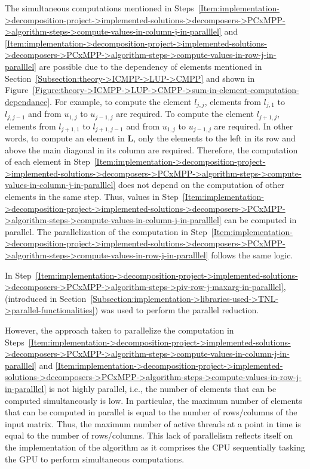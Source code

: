 The simultaneous computations mentioned in Steps~\ref{Item:implementation->decomposition-project->implemented-solutions->decomposers->PCxMPP->algorithm-steps->compute-values-in-column-j-in-paralllel} and \ref{Item:implementation->decomposition-project->implemented-solutions->decomposers->PCxMPP->algorithm-steps->compute-values-in-row-j-in-paralllel} are possible due to the dependency of elements mentioned in Section~\ref{Subsection:theory->ICMPP->LUP->CMPP} and shown in Figure~\ref{Figure:theory->ICMPP->LUP->CMPP->sum-in-element-computation-dependance}. For example, to compute the element $l_{j,j}$, elements from $l_{j,1}$ to $l_{j,j-1}$ and from $u_{1,j}$ to $u_{j-1,j}$ are required. To compute the element $l_{j+1,j}$, elements from $l_{j+1,1}$ to $l_{j+1,j-1}$ and from $u_{1,j}$ to $u_{j-1,j}$ are required. In other words, to compute an element in $\mathbf{L}$, only the elements to the left in its row and above the main diagonal in its column are required. Therefore, the computation of each element in Step~\ref{Item:implementation->decomposition-project->implemented-solutions->decomposers->PCxMPP->algorithm-steps->compute-values-in-column-j-in-paralllel} does not depend on the computation of other elements in the same step. Thus, values in Step~\ref{Item:implementation->decomposition-project->implemented-solutions->decomposers->PCxMPP->algorithm-steps->compute-values-in-column-j-in-paralllel} can be computed in parallel. The parallelization of the computation in Step~\ref{Item:implementation->decomposition-project->implemented-solutions->decomposers->PCxMPP->algorithm-steps->compute-values-in-row-j-in-paralllel} follows the same logic.

In Step~\ref{Item:implementation->decomposition-project->implemented-solutions->decomposers->PCxMPP->algorithm-steps->piv-row-j-maxarg-in-paralllel},  (introduced in Section~\ref{Subsection:implementation->libraries-used->TNL->parallel-functionalities}) was used to perform the parallel reduction.

However, the approach taken to parallelize the computation in Steps~\ref{Item:implementation->decomposition-project->implemented-solutions->decomposers->PCxMPP->algorithm-steps->compute-values-in-column-j-in-paralllel} and \ref{Item:implementation->decomposition-project->implemented-solutions->decomposers->PCxMPP->algorithm-steps->compute-values-in-row-j-in-paralllel} is not highly parallel, i.e., the number of elements that can be computed simultaneously is low. In particular, the maximum number of elements that can be computed in parallel is equal to the number of rows/columns of the input matrix. Thus, the maximum number of active threads at a point in time is equal to the number of rows/columns. This lack of parallelism reflects itself on the implementation of the algorithm as it comprises the CPU sequentially tasking the GPU to perform simultaneous computations.

